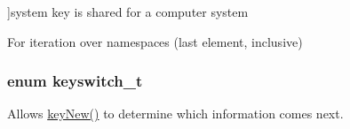 \begin{Desc}
\begin{description}
{}]system key is shared for a computer system \item[{\em 
\hypertarget{group__key_ggaec3b8d6f430ae49b91bafe8a86310a68ad4d0f219a657517ddd50cd06c8190310}{K\+E\+Y\+\_\+\+N\+S\+\_\+\+L\+A\+S\+T}\label{group__key_ggaec3b8d6f430ae49b91bafe8a86310a68ad4d0f219a657517ddd50cd06c8190310}
}]For iteration over namespaces (last element, inclusive) \end{description}
\end{Desc}
\hypertarget{group__key_ga91fb3178848bd682000958089abbaf40}{
\subsubsection[{keyswitch\+\_\+t}]{\setlength{\rightskip}{0pt plus 5cm}enum {\bf keyswitch\+\_\+t}}}\label{group__key_ga91fb3178848bd682000958089abbaf40}


Allows \hyperlink{group__key_gad23c65b44bf48d773759e1f9a4d43b89}{key\+New()} to determine which information comes next. 

